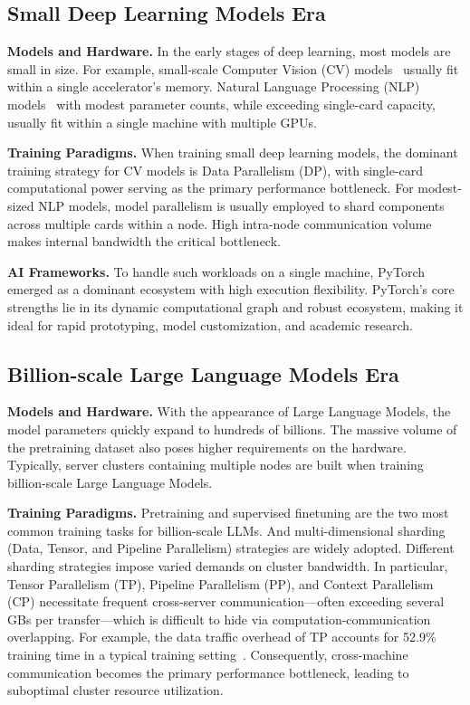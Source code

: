 \documentclass[11pt]{article}
\begin{document}
\subsection{Small Deep Learning Models Era}


\textbf{Models and Hardware.} In the early stages of deep learning, most models are small in size. For example, small-scale Computer Vision (CV) models~\cite{zhao2024review} usually fit within a single accelerator's memory. Natural Language Processing (NLP) models~\cite{liu2019roberta} with modest parameter counts, while exceeding single-card capacity, usually fit within a single machine with multiple GPUs.

\noindent \textbf{Training Paradigms.} When training small deep learning models, the dominant training strategy for CV models is Data Parallelism (DP), with single-card computational power serving as the primary performance bottleneck. For modest-sized NLP models, model parallelism is usually employed to shard components across multiple cards within a node. High intra-node communication volume makes internal bandwidth the critical bottleneck.

\noindent \textbf{AI Frameworks.} To handle such workloads on a single machine, PyTorch~\cite{paszke2019pytorch} emerged as a dominant ecosystem with high execution flexibility. PyTorch's core strengths lie in its dynamic computational graph and robust ecosystem, making it ideal for rapid prototyping, model customization, and academic research. 


\subsection{Billion-scale Large Language Models Era}

\noindent \textbf{Models and Hardware.} With the appearance of Large Language Models, the model parameters quickly expand to hundreds of billions. The massive volume of the pretraining dataset also poses higher requirements on the hardware. Typically, server clusters containing multiple nodes are built when training billion-scale Large Language Models.


\noindent \textbf{Training Paradigms.} Pretraining and supervised finetuning are the two most common training tasks for billion-scale LLMs. And multi-dimensional sharding (Data, Tensor, and Pipeline Parallelism) strategies are widely adopted. Different sharding strategies impose varied demands on cluster bandwidth. In particular, Tensor Parallelism (TP), Pipeline Parallelism (PP), and Context Parallelism (CP) necessitate frequent cross-server communication—often exceeding several GBs per transfer—which is difficult to hide via computation-communication overlapping. For example, the data traffic overhead of TP accounts for 52.9\% training time in a typical training setting~\cite{ubmesh}. Consequently, cross-machine communication becomes the primary performance bottleneck, leading to suboptimal cluster resource utilization.
\end{document}

